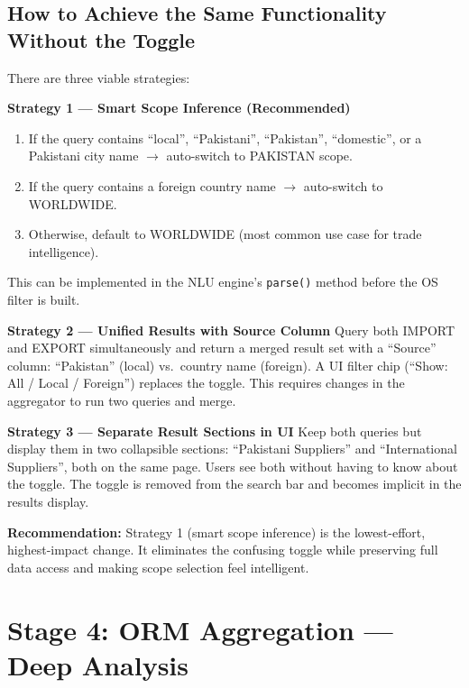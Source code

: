 \documentclass[12pt,a4paper]{article}
\begin{document}
\subsection{How to Achieve the Same Functionality Without the Toggle}

There are three viable strategies:

\textbf{Strategy 1 --- Smart Scope Inference (Recommended)}
\begin{enumerate}
  \item If the query contains ``local'', ``Pakistani'', ``Pakistan'', ``domestic'',
        or a Pakistani city name $\rightarrow$ auto-switch to PAKISTAN scope.
  \item If the query contains a foreign country name $\rightarrow$ auto-switch to WORLDWIDE.
  \item Otherwise, default to WORLDWIDE (most common use case for trade intelligence).
\end{enumerate}
This can be implemented in the NLU engine's \texttt{parse()} method before the
OS filter is built.

\textbf{Strategy 2 --- Unified Results with Source Column}
Query both IMPORT and EXPORT simultaneously and return a merged result set with a
``Source'' column: ``Pakistan'' (local) vs.\ country name (foreign). A UI filter chip
(``Show: All / Local / Foreign'') replaces the toggle. This requires changes in the
aggregator to run two queries and merge.

\textbf{Strategy 3 --- Separate Result Sections in UI}
Keep both queries but display them in two collapsible sections: ``Pakistani Suppliers''
and ``International Suppliers'', both on the same page. Users see both without having
to know about the toggle. The toggle is removed from the search bar and becomes
implicit in the results display.

\begin{okBox}
\textbf{Recommendation:} Strategy 1 (smart scope inference) is the lowest-effort,
highest-impact change. It eliminates the confusing toggle while preserving full
data access and making scope selection feel intelligent.
\end{okBox}

\section{Stage 4: ORM Aggregation --- Deep Analysis}
\end{document}
